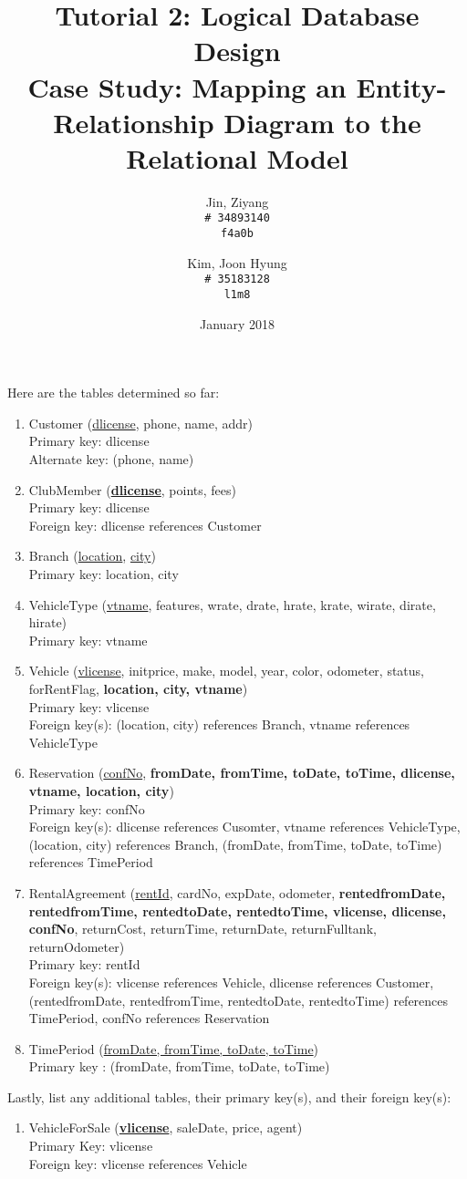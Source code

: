 \documentclass{article}
\title{%
	Tutorial 2: Logical Database Design \\
	\large Case Study: Mapping an Entity-Relationship Diagram to the Relational Model}
\author{
	Jin, Ziyang\\
	\texttt{\# 34893140}\\
	\texttt{f4a0b}
	\and
	Kim, Joon Hyung\\
	\texttt{\# 35183128}\\
	\texttt{l1m8}
}
\date{January 2018}
\begin{document}
	\maketitle
	Here are the tables determined so far:
	\begin{enumerate}
		\item Customer (\underline{dlicense}, phone, name, addr) \\ 
			Primary key: dlicense \\ 
			Alternate key: (phone, name)

		\item ClubMember (\textbf{\underline{dlicense}}, points, fees)\\
			Primary key: dlicense \\
			Foreign key: dlicense references Customer

		\item Branch (\underline{location}, \underline{city}) \\
			Primary key: location, city

		\item VehicleType (\underline{vtname}, features, wrate, drate, hrate, krate, wirate, dirate, hirate) \\
			Primary key: vtname

		\item Vehicle (\underline{vlicense}, initprice, make, model, year, color, odometer, status, forRentFlag, \textbf{location, city, vtname}) \\
			Primary key: vlicense \\
			Foreign key(s): (location, city) references Branch, vtname references VehicleType

		\item Reservation (\underline{confNo}, \textbf{fromDate, fromTime, toDate, toTime, dlicense, vtname, location, city})\\
			Primary key: confNo \\
			Foreign key(s): dlicense references Cusomter, vtname references VehicleType, (location, city) references Branch, (fromDate, fromTime, toDate, toTime) references TimePeriod

		\item RentalAgreement (\underline{rentId}, cardNo, expDate, odometer, \textbf{rentedfromDate, rentedfromTime, rentedtoDate, rentedtoTime, vlicense, dlicense, confNo}, returnCost, returnTime, returnDate, returnFulltank, returnOdometer) \\
			Primary key: rentId \\
			Foreign key(s): vlicense references Vehicle, dlicense references Customer, (rentedfromDate, rentedfromTime, rentedtoDate, rentedtoTime) references TimePeriod, confNo references Reservation

		\item TimePeriod (\underline{fromDate, fromTime, toDate, toTime}) \\
			Primary key : (fromDate, fromTime, toDate, toTime)

	\end{enumerate}
	Lastly, list any additional tables, their primary key(s), and their foreign key(s):
	\begin{enumerate}
		\item VehicleForSale (\textbf{\underline{vlicense}}, saleDate, price, agent) \\
			Primary Key: vlicense \\
			Foreign key: vlicense references Vehicle
	\end{enumerate}
	
\end{document}
